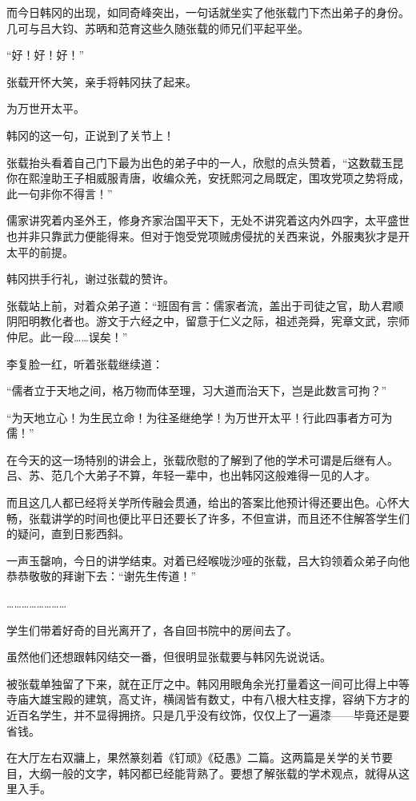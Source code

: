 而今日韩冈的出现，如同奇峰突出，一句话就坐实了他张载门下杰出弟子的身份。几可与吕大钧、苏昞和范育这些久随张载的师兄们平起平坐。

“好！好！好！”

张载开怀大笑，亲手将韩冈扶了起来。

为万世开太平。

韩冈的这一句，正说到了关节上！

张载抬头看着自己门下最为出色的弟子中的一人，欣慰的点头赞着，“这数载玉昆你在熙湟助王子相威服青唐，收编众羌，安抚熙河之局既定，围攻党项之势将成，此一句非你不得言！”

儒家讲究着内圣外王，修身齐家治国平天下，无处不讲究着这内外四字，太平盛世也并非只靠武力便能得来。但对于饱受党项贼虏侵扰的关西来说，外服夷狄才是开太平的前提。

韩冈拱手行礼，谢过张载的赞许。

张载站上前，对着众弟子道：“班固有言：儒家者流，盖出于司徒之官，助人君顺阴阳明教化者也。游文于六经之中，留意于仁义之际，祖述尧舜，宪章文武，宗师仲尼。此一段……误矣！”

李复脸一红，听着张载继续道：

“儒者立于天地之间，格万物而体至理，习大道而治天下，岂是此数言可拘？”

“为天地立心！为生民立命！为往圣继绝学！为万世开太平！行此四事者方可为儒！”

在今天的这一场特别的讲会上，张载欣慰的了解到了他的学术可谓是后继有人。吕、苏、范几个大弟子不算，年轻一辈中，也出韩冈这般难得一见的人才。

而且这几人都已经将关学所传融会贯通，给出的答案比他预计得还要出色。心怀大畅，张载讲学的时间也便比平日还要长了许多，不但宣讲，而且还不住解答学生们的疑问，直到日影西斜。

一声玉罄响，今日的讲学结束。对着已经喉咙沙哑的张载，吕大钧领着众弟子向他恭恭敬敬的拜谢下去：“谢先生传道！”

……………………

学生们带着好奇的目光离开了，各自回书院中的房间去了。

虽然他们还想跟韩冈结交一番，但很明显张载要与韩冈先说说话。

被张载单独留了下来，就在正厅之中。韩冈用眼角余光打量着这一间可比得上中等寺庙大雄宝殿的建筑，高丈许，横阔皆有数丈，中有八根大柱支撑，容纳下方才的近百名学生，并不显得拥挤。只是几乎没有纹饰，仅仅上了一遍漆——毕竟还是要省钱。

在大厅左右双牅上，果然篆刻着《钉顽》《砭愚》二篇。这两篇是关学的关节要目，大纲一般的文字，韩冈都已经能背熟了。要想了解张载的学术观点，就得从这里入手。

